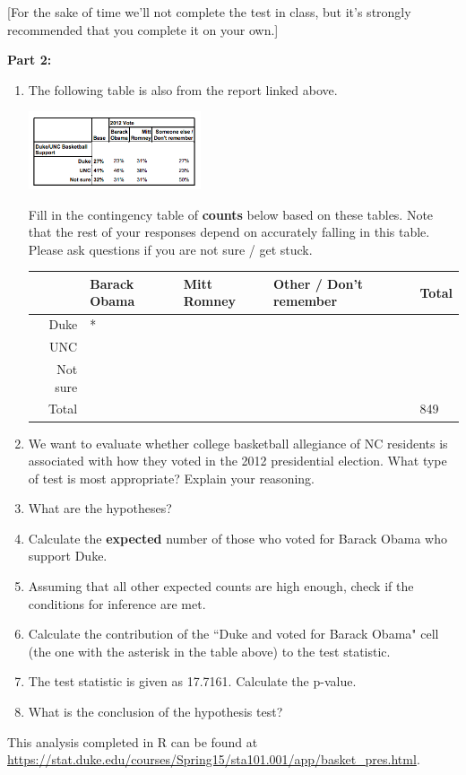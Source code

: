 \documentclass[11pt]{article}
\begin{document}
[For the sake of time we'll not complete the test in class, but it's strongly recommended that you complete it on your own.]

\textbf{Part 2:}

\begin{enumerate}[resume]

\item The following table is also from the report linked above. 

\begin{center}
\includegraphics[width=0.4\textwidth]{pp_basket_pres}
\end{center}

Fill in the contingency table of \textbf{counts} below based on these tables. Note that the rest of your responses depend on accurately falling in this table. Please ask questions if you are not sure / get stuck. %

\begin{center}
\begin{tabular}{r | l | l | l | l}
				& Barack Obama	& Mitt Romney	& Other / Don't remember	& Total \\
\hline
\hline
Duke			& *				& 			&					&  \\
\hline
UNC				& 				& 			& 					&  \\
\hline
Not sure			& 				& 			& 					&  \\
\hline
\hline
Total				& 				& 			& 					& 849 \\
\end{tabular}
\end{center}

\item We want to evaluate whether college basketball allegiance of NC residents is associated with how they voted in the 2012 presidential election. What type of test is most appropriate? Explain your reasoning.

\item What are the hypotheses?

\item Calculate the \textbf{expected} number of those who voted for Barack Obama who support Duke.

\item Assuming that all other expected counts are high enough, check if the conditions for inference are met.

\item Calculate the contribution of the ``Duke and voted for Barack Obama" cell (the one with the asterisk in the table above) to the test statistic.

\item The test statistic is given as 17.7161. Calculate the p-value.

\item What is the conclusion of the hypothesis test?

\end{enumerate}

This analysis completed in R can be found at \url{https://stat.duke.edu/courses/Spring15/sta101.001/app/basket_pres.html}.

%
\end{document}
